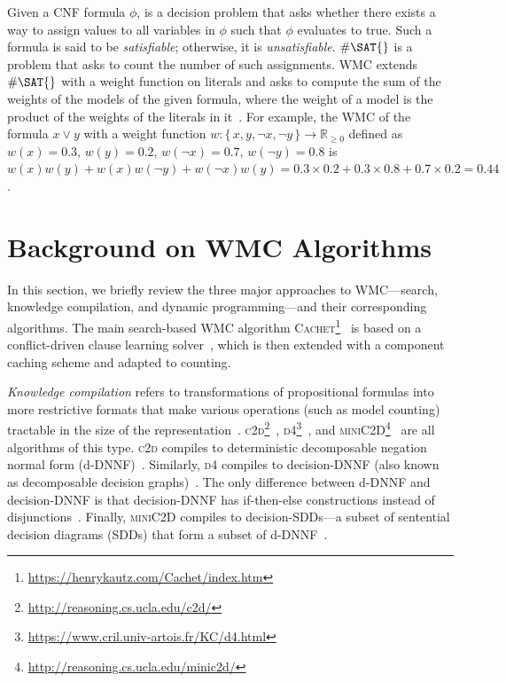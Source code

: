 \documentclass[runningheads]{llncs}
\begin{document}
Given a CNF formula $\phi$, \SAT{} is a decision problem that asks whether there
exists a way to assign values to all variables in $\phi$ such that $\phi$
evaluates to true. Such a formula is said to be \emph{satisfiable}; otherwise,
it is \emph{unsatisfiable}. $\#\SAT{}$ is a problem that asks to count the
number of such assignments. \textsf{WMC} extends $\#\SAT{}$ with a weight
function on literals and asks to compute the sum of the weights of the models of
the given formula, where the weight of a model is the product of the weights of
the literals in it~\cite{DBLP:journals/ai/ChaviraD08}. For example, the
\textsf{WMC} of the formula $x \lor y$ with a weight function $w\colon \{\,x, y,
\neg x, \neg y\,\} \to \mathbb{R}_{\ge 0}$ defined as $w(x) = 0.3$, $w(y) = 0.2$,
$w(\neg x) = 0.7$, $w(\neg y) = 0.8$ is $w(x)w(y)+w(x)w(\neg y)+w(\neg x)w(y) =
0.3 \times 0.2 + 0.3 \times 0.8 + 0.7 \times 0.2 = 0.44$.

\section{Background on \textsf{\textmd{WMC}} Algorithms}\label{sec:background}

In this section, we briefly review the three major approaches to
\textsf{WMC}---search, knowledge compilation, and dynamic programming---and
their corresponding algorithms. The main search-based \textsf{WMC} algorithm
\textsc{Cachet}\footnote{\url{https://henrykautz.com/Cachet/index.htm}}~\cite{DBLP:conf/sat/SangBBKP04}
is based on a conflict-driven clause learning \SAT{}
solver~\cite{DBLP:conf/dac/MoskewiczMZZM01}, which is then extended with a
component caching scheme and adapted to counting.

\emph{Knowledge compilation} refers to transformations of propositional formulas
into more restrictive formats that make various operations (such as model
counting) tractable in the size of the
representation~\cite{DBLP:journals/jair/DarwicheM02}.
\textsc{c2d}\footnote{\url{http://reasoning.cs.ucla.edu/c2d/}}~\cite{DBLP:conf/ecai/Darwiche04},
\textsc{d4}\footnote{\url{https://www.cril.univ-artois.fr/KC/d4.html}}~\cite{DBLP:conf/ijcai/LagniezM17},
and
\textsc{miniC2D}\footnote{\url{http://reasoning.cs.ucla.edu/minic2d/}}~\cite{DBLP:conf/ijcai/OztokD15}
are all algorithms of this type. \textsc{c2d} compiles to deterministic
decomposable negation normal form
(d-DNNF)~\cite{DBLP:journals/jancl/Darwiche01}. Similarly, \textsc{d4} compiles
to decision-DNNF (also known as decomposable decision
graphs)~\cite{DBLP:conf/aaai/FargierM06}. The only difference between d-DNNF and
decision-DNNF is that decision-DNNF has if-then-else constructions instead of
disjunctions~\cite{DBLP:conf/ijcai/LagniezM17}. Finally, \textsc{miniC2D}
compiles to decision-SDDs---a subset of sentential decision diagrams (SDDs) that
form a subset of d-DNNF~\cite{DBLP:conf/ijcai/Darwiche11}.
\end{document}

